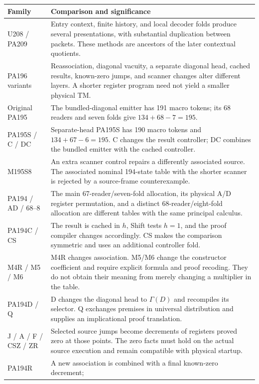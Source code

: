 \documentclass[11pt,letterpaper]{article}
\begin{document}
\begin{longtable}{p{}p{}}
\toprule Family&Comparison and significance\\\midrule\endhead
U208 / PA209&Entry context, finite history, and local decoder folds produce
several presentations, with substantial duplication between packets.
These methods are ancestors of the later contextual quotients.\\[4pt]
PA196 variants&Reassociation, diagonal vacuity, a separate diagonal head,
cached results, known-zero jumps, and scanner changes alter different
layers. A shorter register program need not yield a smaller physical TM.\\[4pt]
Original PA195&The bundled-diagonal emitter has 191 macro tokens;
its 68 readers and seven folds give $134+68-7=195$.\\[4pt]
PA195S / C / DC&Separate-head PA195S has 190 macro tokens and
$134+67-6=195$. C changes the result controller; DC combines the bundled
emitter with the cached controller.\\[4pt]
M195S8&An extra scanner control repairs a differently associated source.
The associated nominal 194-state table with the shorter scanner is rejected
by a source-frame counterexample.\\[4pt]
PA194 / AD / 68--8&The main 67-reader/seven-fold allocation, its physical
A/D register permutation, and a distinct 68-reader/eight-fold allocation
are different tables with the same principal calculus.\\[4pt]
PA194C / CS&The result is cached in $h$, Shift tests $h=1$, and the proof
compiler changes accordingly. CS makes the comparison symmetric and uses
an additional controller fold.\\[4pt]
M4R / M5 / M6&M4R changes association. M5/M6 change the constructor
coefficient and require explicit formula and proof recoding. They do not
obtain their meaning from merely changing a multiplier in the table.\\[4pt]
PA194D / Q&D changes the diagonal head to $\Gamma(D)$ and recompiles its
selector. Q exchanges premises in universal distribution and supplies an
implicational proof translation.\\[4pt]
J / A / F / CSZ / ZR&Selected source jumps become decrements of registers
proved zero at those points. The zero facts must hold on the actual source
execution and remain compatible with physical startup.\\[4pt]
PA194R&A new association is combined with a final known-zero decrement;

\end{longtable}
\end{document}
